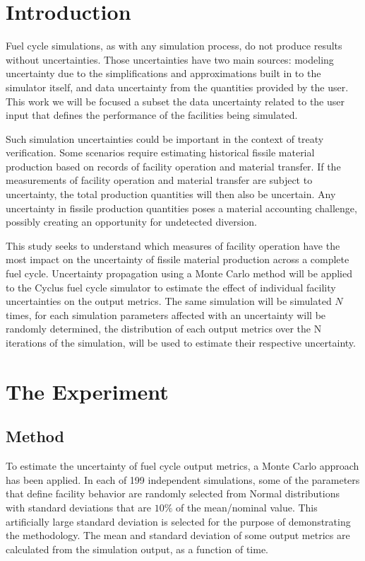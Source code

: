 \documentclass{anstrans}
\title{}
\author{Baptiste Mouginot, Kathryn Mummah, Paul P.H.  Wilson}
\institute{
University of Wisconsin-Madison, Madison, WI
}
\begin{document}
\section{Introduction}

Fuel cycle simulations, as with any simulation process, do not produce results
without uncertainties.  Those uncertainties have two main sources: modeling
uncertainty due to the simplifications and approximations built in to the
simulator itself, and data uncertainty from the quantities provided by the
user. This work we will be focused a subset the data uncertainty related to
the user input that defines the performance of the facilities being simulated.

Such simulation uncertainties could be important in the context of treaty
verification.  Some scenarios require estimating historical fissile material
production based on records of facility operation and material transfer.  If
the measurements of facility operation and material transfer are subject to
uncertainty, the total production quantities will then also be uncertain.  Any
uncertainty in fissile production quantities poses a material accounting
challenge, possibly creating an opportunity for undetected diversion.

This study seeks to understand which measures of facility operation have the
most impact on the uncertainty of fissile material production across a complete
fuel cycle.  Uncertainty propagation using a Monte Carlo method will be applied
to the Cyclus fuel cycle simulator \cite{cyclus} to estimate the effect of
individual facility uncertainties on the output metrics. The same simulation
will be simulated $N$ times, for each simulation parameters affected with an
uncertainty will be randomly determined, the distribution of each output metrics
over the N iterations of the simulation, will be used to estimate their
respective uncertainty.

\section{The Experiment}

\subsection{Method}

To estimate the uncertainty of fuel cycle output metrics, a Monte
Carlo approach has been applied.  In each of 199 independent simulations,
some of the parameters that define facility behavior are randomly selected
from Normal distributions with standard deviations that are $10\%$ of the mean/nominal
value.  This artificially large standard deviation is selected for the purpose
of demonstrating the methodology.  The mean and standard deviation of some
output metrics are calculated from the simulation output, as a function of time.
\end{document}
